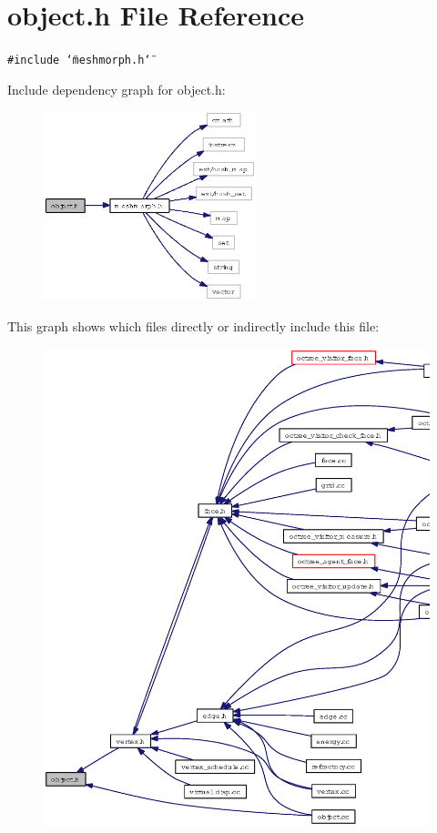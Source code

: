 \section{object.h File Reference}
\label{object_8h}
{\tt \#include \char`\"{}meshmorph.h\char`\"{}}\par


Include dependency graph for object.h:\begin{figure}[H]
\begin{center}
\leavevmode
\includegraphics[width=175pt]{object_8h__incl}
\end{center}
\end{figure}


This graph shows which files directly or indirectly include this file:\begin{figure}[H]
\begin{center}
\leavevmode
\includegraphics[width=367pt]{object_8h__dep__incl}
\end{center}
\end{figure}
